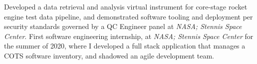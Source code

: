 \documentclass[
  a4paper, 
]{FormatDetails}
\begin{document}
\begin{cvtable}
    \vspace{2mm}
    {Developed a data retrieval and analysis virtual instrument for core-stage rocket engine test data pipeline, and demonstrated software tooling and deployment per security standards governed by a QC Engineer panel at \textit{NASA; Stennis Space Center}.}
    \vspace{2mm}
    {First software engineering internship, at \textit{NASA; Stennis Space Center} for the summer of 2020, where I developed a full stack application that manages a COTS software inventory, and shadowed an agile development team.}
\end{cvtable}
\end{document}
